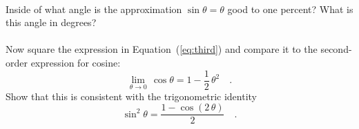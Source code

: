 \documentclass[12pt]{article}
\newcounter{problem}
\begin{document}
\paragraph{\theproblem}%
Inside of what angle is the approximation $\sin\theta=\theta$ good to
one percent?  What is this angle in degrees?

\paragraph{\theproblem}%
Now square the expression in Equation~(\ref{eq:third}) and compare it
to the second-order expression for cosine:
\begin{equation}
\lim_{\theta\rightarrow 0}\,\cos\theta=1-\frac{1}{2}\,\theta^2 \quad .
\end{equation}
Show that this is consistent with the trigonometric identity
\begin{equation}
\sin^2\theta = \frac{1 - \cos(2\,\theta)}{2} \quad .
\end{equation}
\end{document}
